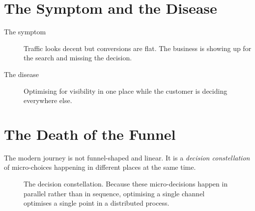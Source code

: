 \section{The Symptom and the Disease}

\begin{description}
\item[The symptom] Traffic looks decent but conversions are flat. The business is
showing up for the search and missing the decision.
\item[The disease] Optimising for visibility in one place while the customer is
deciding everywhere else.
\end{description}

\section{The Death of the Funnel}

The modern journey is not funnel-shaped and linear. It is a \emph{decision
constellation} of micro-choices happening in different places at the same time.

\begin{figure}[htbp]
\centering
{}
\caption[The decision constellation]%
        {The decision constellation. Because these micro-decisions happen in
         parallel rather than in sequence, optimising a single channel optimises
         a single point in a distributed process.}
\label{fig:constellation}
\end{figure}

